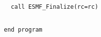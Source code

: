  \begin{verbatim}
  call ESMF_Finalize(rc=rc)
 
\end{verbatim}
 

 \begin{verbatim}
end program
 
\end{verbatim}

\setlength{\parskip}{\oldparskip}
\setlength{\parindent}{\oldparindent}
\setlength{\baselineskip}{\oldbaselineskip}
